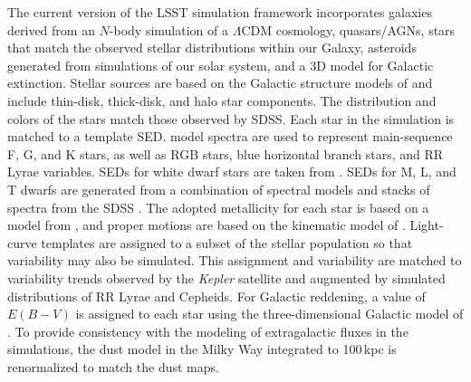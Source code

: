 The current version of the LSST simulation framework incorporates
galaxies derived from an $N$-body simulation of a $\Lambda$CDM
cosmology, quasars/AGNs, stars that match the observed stellar
distributions within our Galaxy, asteroids generated from simulations
of our solar system, and a 3D model for Galactic extinction.  Stellar
sources are based on the Galactic structure models of \citet{2008ApJ...673..864J}
and include thin-disk, thick-disk, and halo star
components. The distribution and colors of the stars match those
observed by SDSS. Each star in the simulation is matched to a template
SED. \citet{1993sssp.book.....K} model spectra are
used to represent main-sequence F, G, and K stars, as well as RGB
stars, blue horizontal branch stars, and RR Lyrae variables.  SEDs for
white dwarf stars are taken from \citet{1995PASP..107.1047B}.  SEDs for M,
L, and T dwarfs are generated from a combination of spectral models
and stacks of spectra from the SDSS
\citep[e.g.,][]{1989A&A...217..187P,2005ApJ...623.1115C,2006ApJ...640.1063B,2007AJ....133..531B,2010ApJ...714L..98K}.
The adopted metallicity for each star is based
on a model from \citet{2008ApJ...684..287I}, and proper motions are
based on the kinematic model of \citet{2010ApJ...716....1B}.  Light-curve
templates are assigned to a subset of the stellar population so that
variability may also be simulated. This assignment and variability are
matched to variability trends observed by the \textit{Kepler} satellite and
augmented by
simulated distributions of RR Lyrae and Cepheids. For Galactic reddening, a
value of $E(B-V)$ is assigned to each star using the three-dimensional
Galactic model of \citet{2005AJ....130..659A}. To provide consistency with
the modeling of extragalactic fluxes in the simulations, the dust model in the Milky Way integrated
to 100\,kpc is renormalized to match the \citet{1998ApJ...500..525S} dust maps.

